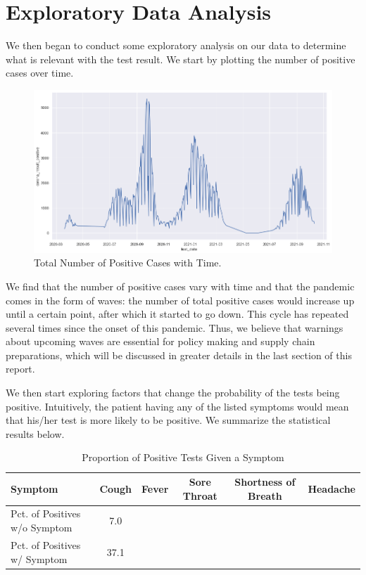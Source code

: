 \documentclass[a4paper]{article}
\begin{document}
\section*{Exploratory Data Analysis}
We then began to conduct some exploratory analysis on our data to determine what is relevant with the test result.
We start by plotting the number of positive cases over time. \par
\begin{figure}[H]
\centering
\includegraphics[scale=0.265]{total.png}
\caption{Total Number of Positive Cases with Time.}
\label{COnfirmed Cases}
\end{figure}
We find that the number of positive cases vary with time and that the pandemic comes in the form of waves: the number of total positive cases would increase up until a certain point, after which it started to go down. This cycle has repeated several times since the onset of this pandemic. Thus, we believe that warnings about upcoming waves are essential for policy making and supply chain preparations, which will be discussed in greater details in the last section of this report. \par
We then start exploring factors that change the probability of the tests being positive. Intuitively, the patient having any of the listed symptoms would mean that his/her test is more likely to be positive. We summarize the statistical results below.\par
\begin{table}[H]
\centering
\caption{Proportion of Positive Tests Given a Symptom}
\begin{tabular}{| l | c | c | c | c | c |}
\hline
Symptom & Cough & Fever & Sore Throat & Shortness of Breath & Headache  \\ \hline
Pct. of Positives w/o Symptom & 7.0 & & & & \\ \hline
Pct. of Positives w/ Symptom & 37.1 & & & &  \\
\hline
\end{tabular}
\label{Table}
\end{table}
\end{document}
